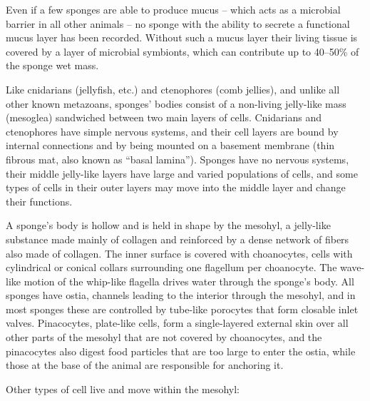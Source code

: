 Even if a few sponges are able to produce mucus -- which acts as a microbial barrier in all other animals -- no sponge with the ability to secrete a functional mucus layer has been recorded. Without such a mucus layer their living tissue is covered by a layer of microbial symbionts, which can contribute up to 40--50\% of the sponge wet mass.

Like cnidarians (jellyfish, etc.) and ctenophores (comb jellies), and unlike all other known metazoans, sponges' bodies consist of a non-living jelly-like mass (mesoglea) sandwiched between two main layers of cells. Cnidarians and ctenophores have simple nervous systems, and their cell layers are bound by internal connections and by being mounted on a basement membrane (thin fibrous mat, also known as ``basal lamina''). Sponges have no nervous systems, their middle jelly-like layers have large and varied populations of cells, and some types of cells in their outer layers may move into the middle layer and change their functions.

A sponge's body is hollow and is held in shape by the mesohyl, a jelly-like substance made mainly of collagen and reinforced by a dense network of fibers also made of collagen. The inner surface is covered with choanocytes, cells with cylindrical or conical collars surrounding one flagellum per choanocyte. The wave-like motion of the whip-like flagella drives water through the sponge's body. All sponges have ostia, channels leading to the interior through the mesohyl, and in most sponges these are controlled by tube-like porocytes that form closable inlet valves. Pinacocytes, plate-like cells, form a single-layered external skin over all other parts of the mesohyl that are not covered by choanocytes, and the pinacocytes also digest food particles that are too large to enter the ostia, while those at the base of the animal are responsible for anchoring it.

Other types of cell live and move within the mesohyl:


